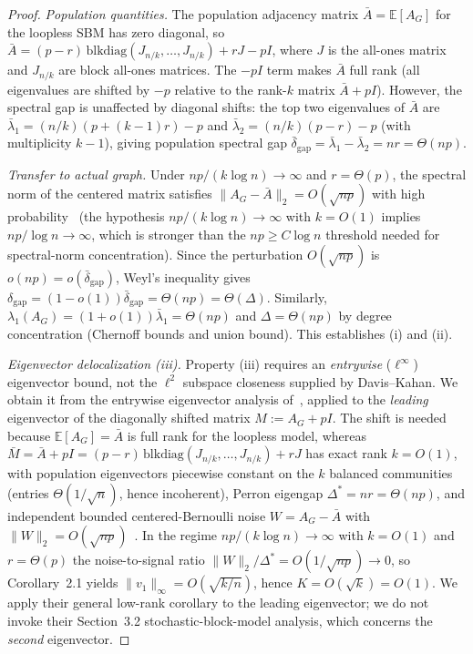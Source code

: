 \documentclass[11pt]{article}
\theoremstyle{definition}
\newcommand{\lamG}{\lambda_1(A_G)}
\newcommand{\vone}{v_1}
\newcommand{\E}{\mathbb{E}}
\begin{document}
\begin{proof}
\emph{Population quantities.}
The population adjacency matrix $\bar{A} = \E[A_G]$ for the loopless SBM has zero
diagonal, so $\bar{A} = (p-r)\,\mathrm{blkdiag}(J_{n/k},\ldots,J_{n/k}) + rJ - pI$,
where $J$ is the all-ones matrix and $J_{n/k}$ are block all-ones matrices.
The $-pI$ term makes $\bar{A}$ full rank (all eigenvalues are shifted by $-p$
relative to the rank-$k$ matrix $\bar{A} + pI$). However, the spectral gap
is unaffected by diagonal shifts: the top two eigenvalues of $\bar{A}$ are
$\bar{\lambda}_1 = (n/k)(p + (k-1)r) - p$ and
$\bar{\lambda}_2 = (n/k)(p - r) - p$ (with multiplicity $k-1$),
giving population spectral gap
$\bar{\delta}_{\mathrm{gap}} = \bar{\lambda}_1 - \bar{\lambda}_2 = nr = \Theta(np)$.

\emph{Transfer to actual graph.}
Under $np/(k\log n) \to \infty$ and $r = \Theta(p)$, the spectral norm of the
centered matrix satisfies $\|A_G - \bar{A}\|_2 = O(\sqrt{np})$ with high
probability~\citep{le2017concentration} (the hypothesis $np/(k\log n) \to \infty$
with $k = O(1)$ implies $np/\log n \to \infty$, which is stronger than the
$np \geq C\log n$ threshold needed for spectral-norm concentration).
Since the perturbation $O(\sqrt{np})$ is $o(np) = o(\bar{\delta}_{\mathrm{gap}})$,
Weyl's inequality gives
$\delta_{\mathrm{gap}} = (1-o(1))\bar{\delta}_{\mathrm{gap}} = \Theta(np) = \Theta(\Delta)$.
Similarly, $\lamG = (1+o(1))\bar{\lambda}_1 = \Theta(np)$ and
$\Delta = \Theta(np)$ by degree concentration (Chernoff bounds and union bound).
This establishes (i) and (ii).

\emph{Eigenvector delocalization (iii).}
Property (iii) requires an \emph{entrywise} ($\ell^\infty$) eigenvector bound, not the
$\ell^2$ subspace closeness supplied by Davis--Kahan. We obtain it from the entrywise
eigenvector analysis of~\citet[Corollary~2.1]{abbe2020entrywise}, applied to the
\emph{leading} eigenvector of the diagonally shifted matrix $M := A_G + pI$. The shift
is needed because $\E[A_G] = \bar{A}$ is full rank for the loopless model, whereas
$\bar{M} = \bar{A} + pI = (p-r)\,\mathrm{blkdiag}(J_{n/k},\ldots,J_{n/k}) + rJ$ has exact
rank $k = O(1)$, with population eigenvectors piecewise constant on the $k$ balanced
communities (entries $\Theta(1/\sqrt{n})$, hence incoherent), Perron eigengap
$\Delta^* = nr = \Theta(np)$, and independent bounded centered-Bernoulli noise
$W = A_G - \bar{A}$ with $\|W\|_2 = O(\sqrt{np})$~\citep{le2017concentration}. In the
regime $np/(k\log n) \to \infty$ with $k = O(1)$ and $r = \Theta(p)$ the noise-to-signal
ratio $\|W\|_2/\Delta^* = O(1/\sqrt{np}) \to 0$, so Corollary~2.1 yields
$\|\vone\|_\infty = O(\sqrt{k/n})$, hence $K = O(\sqrt{k}) = O(1)$. We apply their general
low-rank corollary to the leading eigenvector; we do not invoke their Section~3.2
stochastic-block-model analysis, which concerns the \emph{second} eigenvector.
\end{proof}
\end{document}

